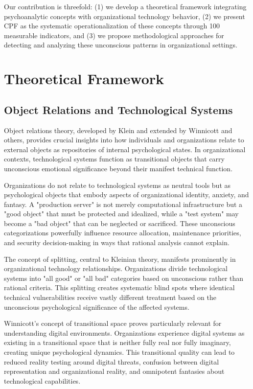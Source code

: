 \documentclass[10pt, twocolumn]{article}
\begin{document}
Our contribution is threefold: (1) we develop a theoretical framework integrating psychoanalytic concepts with organizational technology behavior, (2) we present CPF as the systematic operationalization of these concepts through 100 measurable indicators, and (3) we propose methodological approaches for detecting and analyzing these unconscious patterns in organizational settings.

\section{Theoretical Framework}

\subsection{Object Relations and Technological Systems}

Object relations theory, developed by Klein \cite{klein1946} and extended by Winnicott \cite{winnicott1971} and others, provides crucial insights into how individuals and organizations relate to external objects as repositories of internal psychological states. In organizational contexts, technological systems function as transitional objects that carry unconscious emotional significance beyond their manifest technical function.

Organizations do not relate to technological systems as neutral tools but as psychological objects that embody aspects of organizational identity, anxiety, and fantasy. A "production server" is not merely computational infrastructure but a "good object" that must be protected and idealized, while a "test system" may become a "bad object" that can be neglected or sacrificed. These unconscious categorizations powerfully influence resource allocation, maintenance priorities, and security decision-making in ways that rational analysis cannot explain.

The concept of splitting, central to Kleinian theory, manifests prominently in organizational technology relationships. Organizations divide technological systems into "all good" or "all bad" categories based on unconscious rather than rational criteria. This splitting creates systematic blind spots where identical technical vulnerabilities receive vastly different treatment based on the unconscious psychological significance of the affected systems.

Winnicott's concept of transitional space \cite{winnicott1971} proves particularly relevant for understanding digital environments. Organizations experience digital systems as existing in a transitional space that is neither fully real nor fully imaginary, creating unique psychological dynamics. This transitional quality can lead to reduced reality testing around digital threats, confusion between digital representation and organizational reality, and omnipotent fantasies about technological capabilities.
\end{document}
